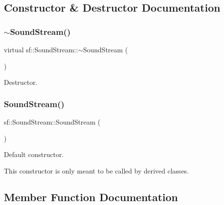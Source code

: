 \subsection{Constructor \& Destructor Documentation}
\mbox{\label{classsf_1_1_sound_stream_a1fafb9f1ca572d23d7d6a17921860d85}} 
\subsubsection{\texorpdfstring{$\sim$SoundStream()}{~SoundStream()}}
{\footnotesize\ttfamily virtual sf\+::\+Sound\+Stream\+::$\sim$\+Sound\+Stream (\begin{DoxyParamCaption}{ }\end{DoxyParamCaption})\hspace{0.3cm}{\ttfamily [virtual]}}



Destructor. 

\begin{DoxyVerb}\end{DoxyVerb}
 \mbox{\label{classsf_1_1_sound_stream_a769d08f4c3c6b4340ef3a838329d2e5c}} 
\subsubsection{\texorpdfstring{SoundStream()}{SoundStream()}}
{\footnotesize\ttfamily sf\+::\+Sound\+Stream\+::\+Sound\+Stream (\begin{DoxyParamCaption}{ }\end{DoxyParamCaption})\hspace{0.3cm}{\ttfamily [protected]}}



Default constructor. 

This constructor is only meant to be called by derived classes. \begin{DoxyVerb}\end{DoxyVerb}
 

\subsection{Member Function Documentation}
\mbox{\label{classsf_1_1_sound_stream_ac0fdfe8ec3e5b662f0b7956ba894f5bc}} 
